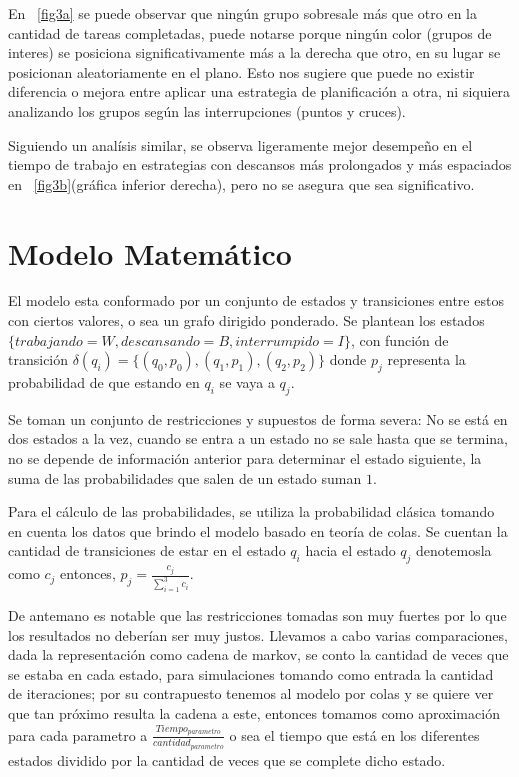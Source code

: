 \documentclass[10pt,a4paper,twocolumn]{article}
\begin{document}
En ~\ref{fig3a} se puede observar que ningún grupo sobresale más que otro en la cantidad de tareas completadas, puede notarse porque ningún color (grupos de interes) se posiciona significativamente m\'as a la derecha que otro, en su lugar se posicionan aleatoriamente en el plano. Esto nos sugiere que puede no existir diferencia o mejora entre aplicar una estrategia de planificaci\'on a otra, ni siquiera analizando los grupos seg\'un las interrupciones (puntos y cruces).

Siguiendo un analísis similar, se observa ligeramente mejor desempeño en el tiempo de trabajo en estrategias con descansos más prolongados y más espaciados en ~\ref{fig3b}(gráfica inferior derecha), pero no se asegura que sea significativo.



\section{Modelo Matem\'atico}

El modelo esta conformado por un conjunto de estados y transiciones entre estos con ciertos valores, o sea un grafo dirigido ponderado. Se plantean los estados $\{trabajando = W, descansando = B, interrumpido = I\}$, con funci\'on de transici\'on $\delta(q_i) = \{(q_0, p_0), (q_1, p_1), (q_2, p_2)\}$ donde $p_j$ representa la probabilidad de que estando en $q_i$ se vaya a $q_j$.

Se toman un conjunto de restricciones y supuestos de forma severa: No se est\'a en dos estados a la vez, cuando se entra a un estado no se sale hasta que se termina, no se depende de informaci\'on anterior para determinar el estado siguiente, la suma de las probabilidades que salen de un estado suman $1$.

Para el c\'alculo de las probabilidades, se utiliza la probabilidad cl\'asica tomando en cuenta los datos que brindo el modelo basado en teor\'ia de colas. Se cuentan la cantidad de transiciones de estar en el estado $q_i$ hacia el estado $q_j$ denotemosla como $c_j$ entonces, $p_j = \frac{c_j}{\sum_{i=1}^{3} c_i}$.

De antemano es notable que las restricciones tomadas son muy fuertes por lo que los resultados no deber\'ian ser muy justos. Llevamos a cabo varias comparaciones, dada la representaci\'on como cadena de markov, se conto la cantidad de veces que se estaba en cada estado, para simulaciones tomando como entrada la cantidad de iteraciones; por su contrapuesto tenemos al modelo por colas y se quiere ver que tan pr\'oximo resulta la cadena a este, entonces tomamos como aproximaci\'on para cada parametro a $\frac{Tiempo_{parametro}}{cantidad_{parametro}}$ o sea el tiempo que est\'a en los diferentes estados dividido por la cantidad de veces que se complete dicho estado.
\end{document}
